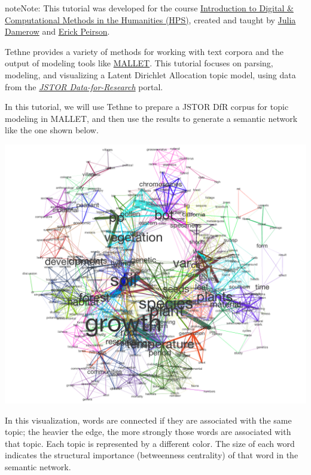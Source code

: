 \documentclass[letterpaper,10pt,english]{sphinxmanual}
\begin{document}
\begin{center}\setlength{\fboxsep}{5pt}\end{center}

\begin{notice}{note}{Note:}
This tutorial was developed for the course \href{http://devo-evo.lab.asu.edu/methods}{Introduction to Digital \&
Computational Methods in the Humanities (HPS)},
created and taught by \href{http://devo-evo.lab.asu.edu/?q=damerow}{Julia Damerow} and
\href{http://gradinfo.cbs.asu.edu/?page\_id=49}{Erick Peirson}.
\end{notice}

Tethne provides a variety of methods for working with text corpora and the output of
modeling tools like \href{http://mallet.cs.umass.edu/topics.php}{MALLET}. This tutorial
focuses on parsing, modeling, and visualizing a Latent Dirichlet Allocation topic model,
using data from the {\hyperref[tutorial.getting_data:getting-jstor]{\emph{JSTOR Data-for-Research}}} portal.

In this tutorial, we will use Tethne to prepare a JSTOR DfR corpus for topic modeling in
MALLET, and then use the results to generate a semantic network like the one shown below.

{\hfill\includegraphics{semantic_network.png}\hfill}

In this visualization, words are connected if they are associated with the same topic; the
heavier the edge, the more strongly those words are associated with that topic. Each topic
is represented by a different color. The size of each word indicates the structural
importance (betweenness centrality) of that word in the semantic network.
\end{document}
